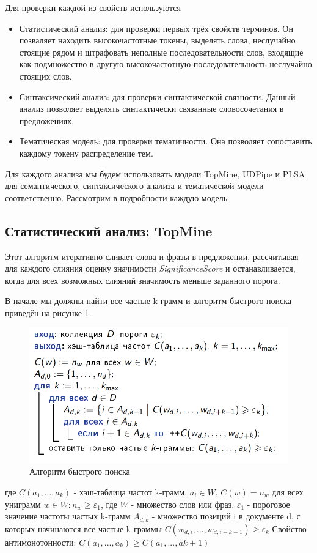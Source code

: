Для проверки каждой из свойств используются 

\begin{itemize}
	\item Статистический анализ: для проверки первых трёх свойств терминов. Он позваляет находить высокочастотные токены, выделять слова, неслучайно стоящие рядом и штрафовать неполные последовательности слов, входящие как подмножество в другую высокочастотную последовательность неслучайно стоящих слов.
	\item Синтаксический анализ: для проверки синтактической связности. Данный анализ позволяет выделять синтактически связанные словосочетания в предложениях.
	\item Тематическая модель: для проверки тематичности. Она позволяет сопоставить каждому токену распределение тем.
\end{itemize}

Для каждого анализа мы будем использовать модели TopMine, UDPipe и PLSA для семантического, синтаксического анализа и тематической модели соответственно. Рассмотрим в подробности каждую модель

\subsection*{Статистический анализ: TopMine}

Этот алгоритм итеративно сливает слова и фразы в предложении, рассчитывая для каждого слияния оценку значимости \textit{SignificanceScore} и останавливается, когда для всех возможных слияний значимость меньше заданного порога. 

В начале мы должны найти все частые k-грамм и алгоритм быстрого поиска приведён на рисунке 1.
\begin{figure}
    \includegraphics[scale = 0.5]{images/ml1.png}
    \caption{Алгоритм быстрого поиска}
\end{figure}
где $C(a_{1},...,a_{k})$ - хэш-таблица частот k-грамм, $a_{i} \in W$, $C(w) = n_{w}$ для всех униграмм $w \in W: n_{w} \geq \varepsilon_{1}$, где $W$ - множество слов или фраз.
$\varepsilon_{1}$ - пороговое значение частоты частых k-грамм
$A_{d,k}$ - множество позиций i в документе d, с которых начинаются все частые k-граммы
$C(w_{d,i},...,w_{d,i+k-1}) \geq \varepsilon_{k}$
Свойство антимонотонности: $C(a_{1},...,a_{k}) \geq C(a_{1},...,a{k+1})$

